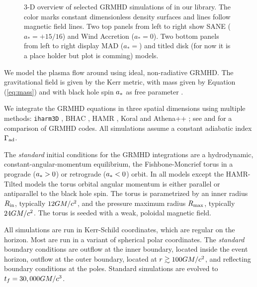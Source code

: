 \begin{figure}
  \caption{3-D overview of selected GRMHD simulations of \sgra in our library. The color marks constant dimensionless density surfaces and lines follow magnetic field lines. Two top panels from left to right show SANE ($a_*=+15/16$) and Wind Accretion ($a_*=0$). Two bottom panels from left to right display MAD ($a_*=$) and titled disk (for now it is a place holder but plot is comming) models.}
  \label{fig:GRMHD}
\end{figure}

We model the plasma flow around \sgra using ideal, non-radiative GRMHD.  The gravitational field is given by the Kerr metric, with mass given by Equation (\ref{eq:mass}) and with black hole spin $a_*$ as free parameter \citep[see e.g.,][]{2003ApJ...589..444G, 2005ApJ...635..723A, 2007A&A...473...11D}.

We integrate the GRMHD equations in three spatial dimensions using multiple methods: {\tt iharm3D} \citep{2021JOSS....6.3336P}, BHAC \citep{2017ComAC...4....1P}, HAMR \citep{2018MNRAS.474L..81L}, Koral \citep{2013MNRAS.429.3533S} and Athena++ \citep{2016ApJS..225...22W}; see \citealt{2019ApJS..243...26P} and \citet[in prep]{Olivares_et_al} for a comparison of GRMHD codes.  All simulations assume a constant adiabatic index $\Gamma_{\rm ad}$.

The \emph{standard} initial conditions for the GRMHD integrations are a hydrodynamic, constant-angular-momentum equilibrium, the Fishbone-Moncrief torus \citep{1976ApJ...207..962F} in a prograde ($a_* > 0$) or retrograde ($a_* < 0$) orbit.  In all models except the HAMR-Tilted models the torus orbital angular momentum is either parallel or antiparallel to the black hole spin. The torus is parametrized by an inner radius $R_{\rm in}$, typically $12GM/c^2$, and the pressure maximum radius $R_{\rm max}$, typically $24GM/c^2$.
The torus is seeded with a weak, poloidal magnetic field.

All simulations are run in Kerr-Schild coordinates, which are regular on the horizon.  Most are run in a variant of spherical polar coordinates.  The {\em standard} boundary conditions are outflow at the inner boundary, located inside the event horizon, outflow at the outer boundary, located at $r \gtrsim 100 GM/c^2$, and reflecting boundary conditions at the poles.  Standard  simulations are evolved to $t_f=30,000 GM/c^3$.

